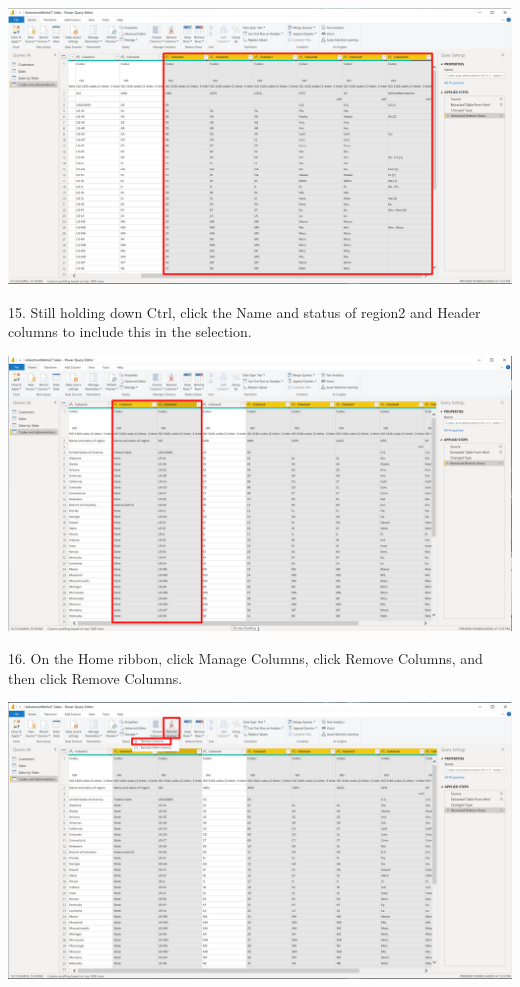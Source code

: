 \documentclass[12pt,letterpaper]{article}
\begin{document}
\begin{center}
    \includegraphics[width=17cm]{img/53.png}  
\end{center}
15. Still holding down Ctrl, click the Name and status of region2 and Header columns to include this in the
selection.
\begin{center}
    \includegraphics[width=17cm]{img/54.png}
    \vspace{2cm}   
\end{center}
16. On the Home ribbon, click Manage Columns, click Remove Columns, and then click Remove Columns.
\begin{center}
    \includegraphics[width=17cm]{img/55.png}  
\end{center}
\end{document}
